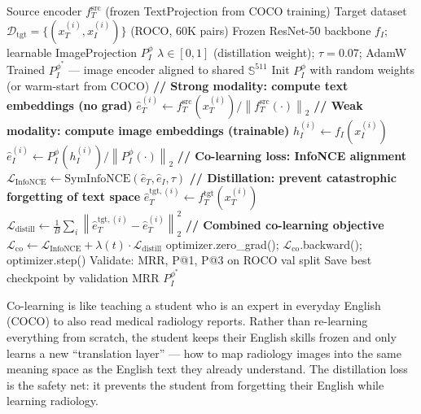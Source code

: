 \documentclass[12pt,a4paper]{article}
\theoremstyle{definition}
\theoremstyle{plain}
\theoremstyle{remark}
\newcommand{\Sph}{\mathbb{S}}
\newcommand{\Norm}[1]{\left\|#1\right\|}
\begin{document}
\begin{algorithm}[H]
\caption{Challenge 4: Co-learning via Surgical Domain Transfer}
\label{alg:colearn}
\begin{algorithmic}[1]
\Require Source encoder $f_T^{\text{src}}$ (frozen TextProjection from COCO training)
\Require Target dataset $\mathcal{D}_{\text{tgt}} = \{(x_T^{(i)}, x_I^{(i)})\}$ (ROCO, 60K pairs)
\Require Frozen ResNet-50 backbone $f_I$; learnable ImageProjection $P_I^\phi$
\Require $\lambda \in [0,1]$ (distillation weight); $\tau = 0.07$; AdamW
\Ensure Trained $P_I^{\phi^*}$ — image encoder aligned to shared $\Sph^{511}$
\State Init $P_I^\phi$ with random weights (or warm-start from COCO)
    \State \textbf{// Strong modality: compute text embeddings (no grad)}
    \State $\hat{e}_T^{(i)} \gets f_T^{\text{src}}(x_T^{(i)}) / \Norm{f_T^{\text{src}}(\cdot)}_2$ 
    \State \textbf{// Weak modality: compute image embeddings (trainable)}
    \State $h_I^{(i)} \gets f_I(x_I^{(i)})$ 
    \State $\hat{e}_I^{(i)} \gets P_I^\phi(h_I^{(i)}) / \Norm{P_I^\phi(\cdot)}_2$
    \State \textbf{// Co-learning loss: InfoNCE alignment}
    \State $\mathcal{L}_{\text{InfoNCE}} \gets \text{SymInfoNCE}(\hat{e}_T, \hat{e}_I, \tau)$ 
    \State \textbf{// Distillation: prevent catastrophic forgetting of text space}
    \State $\hat{e}_T^{\text{tgt},(i)} \gets f_T^{\text{tgt}}(x_T^{(i)})$ 
    \State $\mathcal{L}_{\text{distill}} \gets \frac{1}{B}\sum_i \Norm{\hat{e}_T^{\text{tgt},(i)} - \hat{e}_T^{(i)}}_2^2$
    \State \textbf{// Combined co-learning objective}
    \State $\mathcal{L}_{\text{co}} \gets \mathcal{L}_{\text{InfoNCE}} + \lambda(t) \cdot \mathcal{L}_{\text{distill}}$
    \State optimizer.zero\_grad(); $\mathcal{L}_{\text{co}}$.backward(); optimizer.step()
  \EndFor
  \State Validate: MRR, P@1, P@3 on ROCO val split
  \State Save best checkpoint by validation MRR
\EndFor
\State \Return $P_I^{\phi^*}$
\end{algorithmic}
\end{algorithm}

\begin{tcolorbox}[laymanbox]
Co-learning is like teaching a student who is an expert in everyday English (COCO) to also read medical radiology reports. Rather than re-learning everything from scratch, the student keeps their English skills frozen and only learns a new ``translation layer'' — how to map radiology images into the same meaning space as the English text they already understand. The distillation loss is the safety net: it prevents the student from forgetting their English while learning radiology.
\end{tcolorbox}
\end{document}
